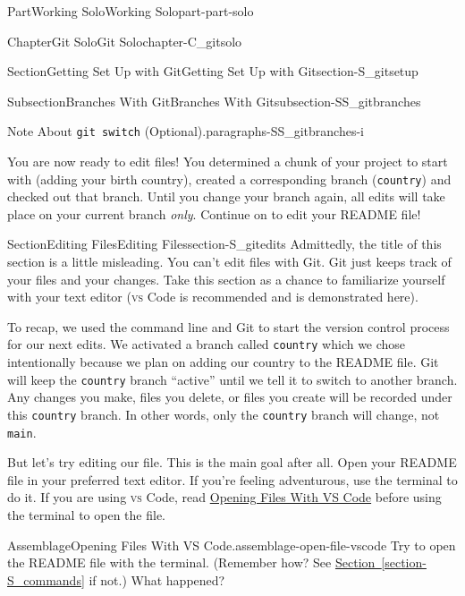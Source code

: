 \documentclass[oneside,10pt,]{book}
\newcommand{\xreffont}{\relax}
\newcommand{\mono}[1]{\texttt{#1}}
\newcommand{\initialism}[1]{\textsc{\MakeLowercase{#1}}}
\DeclareRobustCommand{\initialismintitle}[1]{\texorpdfstring{#1}{#1}}
\begin{document}
\begin{partptx}{Part}{Working Solo}{}{Working Solo}{}{}{part-part-solo}
\begin{chapterptx}{Chapter}{Git Solo}{}{Git Solo}{}{}{chapter-C_gitsolo}
\begin{sectionptx}{Section}{Getting Set Up with Git}{}{Getting Set Up with Git}{}{}{section-S_gitsetup}
\begin{subsectionptx}{Subsection}{Branches With Git}{}{Branches With Git}{}{}{subsection-SS_gitbranches}
\begin{paragraphs}{Note About \mono{git switch} (Optional).}{paragraphs-SS_gitbranches-i}
\end{paragraphs}%
\end{subsectionptx}
\begin{conclusion}{}%
You are now ready to edit files! You determined a chunk of your project to start with (adding your birth country), created a corresponding branch (\mono{country}) and checked out that branch. Until you change your branch again, all edits will take place on your current branch \emph{only}. Continue on to edit your README file!%
\end{conclusion}%
\end{sectionptx}
%
%
\typeout{************************************************}
\typeout{************************************************}
%
\begin{sectionptx}{Section}{Editing Files}{}{Editing Files}{}{}{section-S_gitedits}
%
%
%
Admittedly, the title of this section is a little misleading. You can't edit files with Git. Git just keeps track of your files and your changes. Take this section as a chance to familiarize yourself with your text editor (\initialism{VS} Code is recommended and is demonstrated here).%
\par
To recap, we used the command line and Git to start the version control process for our next edits. We activated a branch called \mono{country} which we chose intentionally because we plan on adding our country to the README file. Git will keep the \mono{country} branch ``active'' until we tell it to switch to another branch. Any changes you make, files you delete, or files you create will be recorded under this \mono{country} branch. In other words, only the \mono{country} branch will change, not \mono{main}.%
\par
But let's try editing our file. This is the main goal after all. Open your README file in your preferred text editor. If you're feeling adventurous, use the terminal to do it. If you are using \initialism{VS} Code, read \hyperref[assemblage-open-file-vscode]{Opening Files With \initialismintitle{VS} Code} before using the terminal to open the file.%
\begin{assemblage}{Assemblage}{Opening Files With \initialismintitle{VS} Code.}{assemblage-open-file-vscode}%
Try to open the README file with the terminal. (Remember how? See \hyperref[section-S_commands]{Section~{\xreffont\ref{section-S_commands}}} if not.) What happened?%
\par

\end{assemblage}
\end{sectionptx}
\end{chapterptx}
\end{partptx}
\end{document}
